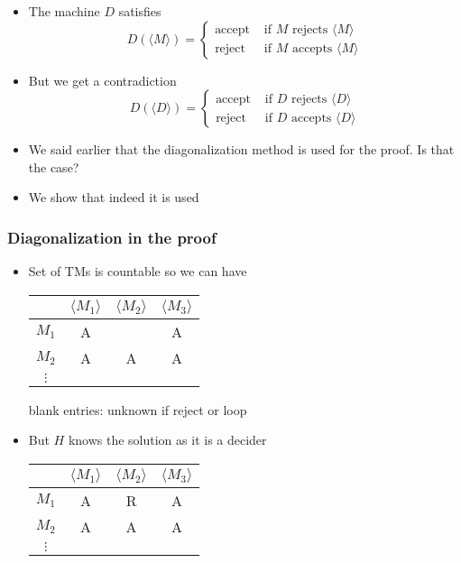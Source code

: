 \begin{frame}[allowframebreaks]
\begin{itemize}
\item The machine $D$ satisfies
  \begin{equation*}
    D(\langle  M\rangle )
=
\begin{cases}
  \mbox{accept } & 
  \mbox{if } M \mbox{ rejects } \langle  M\rangle \\
  \mbox{reject } &   
\mbox{if } M \mbox{ accepts } \langle  M\rangle
\end{cases}
  \end{equation*}

\item But we get a contradiction
  \begin{equation*}
    D(\langle  D\rangle )
=
\begin{cases}
  \mbox{accept } & 
\mbox{if } D \mbox{ rejects } \langle  D\rangle \\
\mbox{reject} & \mbox{if } D \mbox{ accepts } \langle  D\rangle 
\end{cases}
  \end{equation*}
\item We said earlier that the diagonalization method
  is used for the proof. Is that the case?
\item We show that indeed it is used
  
\end{itemize}\end{frame} \begin{frame}[allowframebreaks] \frametitle{Diagonalization in the proof}
  \begin{itemize}
\item Set of TMs is countable so we can have
  \begin{center}
    \begin{tabular}{c|ccc}
& $\langle  M_1\rangle $ & $\langle  M_2\rangle $ & $\langle  M_3\rangle $\\ \hline
$M_1$ & A & &A\\
$M_2$ & A & A &A\\
$\vdots$ &&&
    \end{tabular}
  \end{center}
blank entries: unknown if reject or loop

\item But $H$ knows the solution as it is a decider
  
  \begin{center}
    \begin{tabular}{c|ccc}
& $\langle  M_1\rangle $ & $\langle  M_2\rangle $ & $\langle  M_3\rangle $\\ \hline
$M_1$ & A & R & A\\
$M_2$ & A & A & A\\
$\vdots$ &&&
    \end{tabular}
  \end{center}


\end{itemize}
\end{frame}
